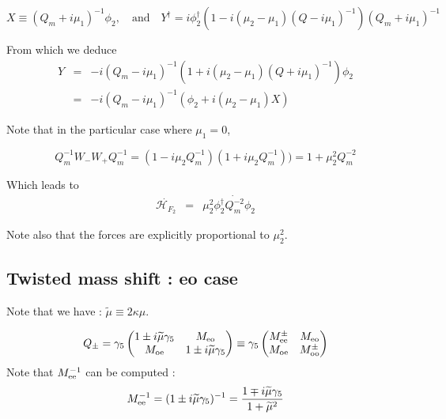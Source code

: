 \documentclass{article}[12pt]
\begin{document}
\begin{equation}
X\equiv (Q_m+i\mu_1)^{-1}\phi_2,\quad\textrm{and}\quad Y^{\dagger}=i\phi_2^\dagger
(1 -i (\mu_2-\mu_1) (Q-i\mu_1)^{-1}) (Q_m+i\mu_1)^{-1}
\end{equation}

From which we deduce 
\begin{eqnarray}
Y &=&   -i (Q_m - i \mu_1)^{-1}(1 +  i(\mu_2-\mu_1)(Q+i\mu_1)^{-1})
\phi_2 \\ &=&-i (Q_m - i \mu_1)^{-1}  ( \phi_2  + i(\mu_2-\mu_1)  X)  
\end{eqnarray}


Note that in the particular case where $\mu_1=0$, 

\begin{equation}
Q_m^{-1} W_- W_+ Q_m^{-1} = ( 1 - i\mu_2Q_m^{-1}) (1+ i\mu_2Q_m^{-1}))
= 1 + \mu_2^2 Q_m^{-2}
\end{equation}

Which leads to 
\begin{eqnarray}
 \dot{\mathcal{H}_{F_2}}  &=& \mu_2^2 \phi_2^{\dagger} \dot{Q_m^{-2}} \phi_2
\end{eqnarray}

Note also that the forces are explicitly
proportional to $\mu_2^2$.

\subsection{Twisted mass shift : eo case}

Note that we have : $\widetilde{\mu} \equiv 2 \kappa \mu$.

\begin{equation}
Q_{\pm}= \gamma_5 \begin{pmatrix} 
1 \pm i \widetilde{\mu} \gamma_5 & M_{\rm{eo}} \\
M_{\rm{oe}} & 1 \pm i \widetilde{\mu} \gamma_5\\
\end{pmatrix} \equiv \gamma_5 \begin{pmatrix} 
M^{\pm}_{\rm{ee}}  & M_{\rm{eo}} \\
M_{\rm{oe}} & M^{\pm}_{\rm{oo}}\\
\end{pmatrix}
\end{equation}
Note that $M_{\rm{ee}}^{-1}$ can be computed : 
\begin{equation}
M_{\rm{ee}}^{-1} = ( 1 \pm i\widetilde{\mu} \gamma_5)^{-1} = \frac{1\mp
i \widetilde{\mu}\gamma_5 }{ 1 + \widetilde{\mu}^2}
\end{equation}
\end{document}
